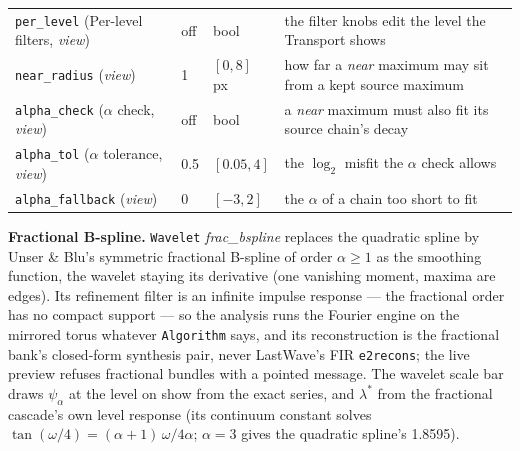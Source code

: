 \documentclass[10pt]{article}
\begin{document}
\begin{longtable}{L l l M}
\texttt{per\_level} (Per-level filters, \emph{view}) & off & bool & the filter knobs edit the level the Transport shows \\
\texttt{near\_radius} (\emph{view}) & 1 & $[0,8]$ px & how far a \emph{near} maximum may sit from a kept source maximum \\
\texttt{alpha\_check} ($\alpha$ check, \emph{view}) & off & bool & a \emph{near} maximum must also fit its source chain's decay \\
\texttt{alpha\_tol} ($\alpha$ tolerance, \emph{view}) & 0.5 & $[0.05,4]$ & the $\log_2$ misfit the $\alpha$ check allows \\
\texttt{alpha\_fallback} (\emph{view}) & 0 & $[-3,2]$ & the $\alpha$ of a chain too short to fit \\
\bottomrule
\end{longtable}

\textbf{Fractional B-spline.}\label{sec:mz-frac} \texttt{Wavelet} \emph{frac\_bspline} replaces the quadratic spline by
Unser \& Blu's symmetric fractional B-spline of order $\alpha\ge1$ as the smoothing function, the
wavelet staying its derivative (one vanishing moment, maxima are edges). Its refinement filter is an
infinite impulse response --- the fractional order has no compact support --- so the analysis runs the
Fourier engine on the mirrored torus whatever \texttt{Algorithm} says, and its reconstruction is the
fractional bank's closed-form synthesis pair, never LastWave's FIR \texttt{e2recons}; the live
preview refuses fractional bundles with a pointed message. The wavelet scale bar draws $\psi_\alpha$ at
the level on show from the exact series, and $\lambda^*$ from the fractional cascade's own level
response (its continuum constant solves $\tan(\omega/4)=(\alpha+1)\,\omega/4\alpha$; $\alpha=3$ gives
the quadratic spline's 1.8595).
\end{document}

